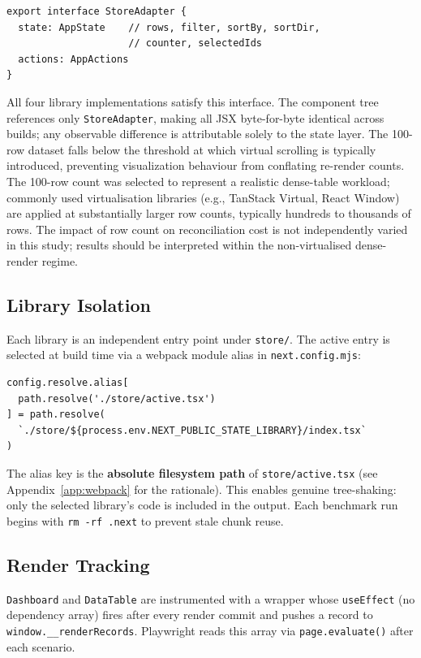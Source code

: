 \documentclass[conference]{IEEEtran}
\newcommand{\code}[1]{\texttt{\small #1}}
\begin{document}
\begin{lstlisting}
export interface StoreAdapter {
  state: AppState    // rows, filter, sortBy, sortDir,
                     // counter, selectedIds
  actions: AppActions
}
\end{lstlisting}

All four library implementations satisfy this interface. The component
tree references only \code{StoreAdapter}, making all JSX byte-for-byte
identical across builds; any observable difference is attributable
solely to the state layer. The 100-row dataset falls below the threshold
at which virtual scrolling is typically introduced, preventing
visualization behaviour from conflating re-render counts. The 100-row
count was selected to represent a realistic dense-table workload;
commonly used virtualisation libraries (e.g., TanStack Virtual, React
Window) are applied at substantially larger row counts, typically
hundreds to thousands of rows. The impact of row count on reconciliation
cost is not independently varied in this study; results should be
interpreted within the non-virtualised dense-render regime.

\subsection{Library Isolation}

Each library is an independent entry point under \code{store/}. The
active entry is selected at build time via a webpack module alias in
\code{next.config.mjs}:

\begin{lstlisting}
config.resolve.alias[
  path.resolve('./store/active.tsx')
] = path.resolve(
  `./store/${process.env.NEXT_PUBLIC_STATE_LIBRARY}/index.tsx`
)
\end{lstlisting}

The alias key is the \textbf{absolute filesystem path} of
\code{store/active.tsx} (see Appendix~\ref{app:webpack} for the
rationale). This enables genuine tree-shaking: only the selected
library's code is included in the output. Each benchmark run begins with
\code{rm -rf .next} to prevent stale chunk reuse.

\subsection{Render Tracking}

\code{Dashboard} and \code{DataTable} are instrumented with a
\code{<RenderTracker id>} wrapper whose \code{useEffect} (no
dependency array) fires after every render commit and pushes a record to
\lstinline|window.__renderRecords|. Playwright reads this array via
\code{page.evaluate()} after each scenario.
\end{document}
